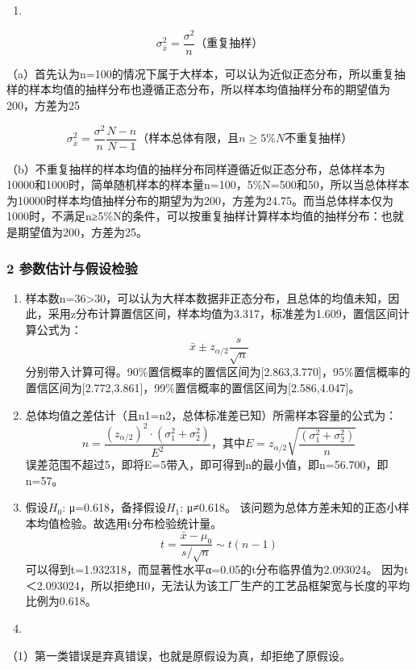 \documentclass[]{article}
\begin{document}
\begin{enumerate}
\def\labelenumi{\arabic{enumi}.}
\setcounter{enumi}{4}
\item
\end{enumerate}

\[ \sigma_{\bar x}^2=\frac{\sigma^2}{n} （重复抽样）\]

（a）首先认为n=100的情况下属于大样本，可以认为近似正态分布，所以重复抽样的样本均值的抽样分布也遵循正态分布，所以样本均值抽样分布的期望值为200，方差为25

\[ \sigma_{\bar x}^2=\frac{\sigma^2}{n}\frac{N-n}{N-1} （样本总体有限，且n\ge 5\%N不重复抽样）\]

（b）不重复抽样的样本均值的抽样分布同样遵循近似正态分布，总体样本为10000和1000时，简单随机样本的样本量n=100，5\%N=500和50，所以当总体样本为10000时样本均值抽样分布的期望为为200，方差为24.75。而当总体样本仅为1000时，不满足n≥5\%N的条件，可以按重复抽样计算样本均值的抽样分布：也就是期望值为200，方差为25。

\subsubsection{2 参数估计与假设检验}

\begin{enumerate}
\def\labelenumi{\arabic{enumi}.}
\item
  样本数n=36\textgreater{}30，可以认为大样本数据非正态分布，且总体的均值未知，因此，采用z分布计算置信区间，样本均值为3.317，标准差为1.609，置信区间计算公式为：
  \[ \bar x\pm z_{\alpha/2}\frac{s}{\sqrt{n}} \]
  分别带入计算可得。90\%置信概率的置信区间为{[}2.863,3.770{]}，95\%置信概率的置信区间为{[}2.772,3.861{]}，99\%置信概率的置信区间为{[}2.586,4.047{]}。
\item
  总体均值之差估计（且n1=n2，总体标准差已知）所需样本容量的公式为：
  \[ n=\frac{(z_{\alpha/2})^2\cdot(\sigma_1^2+\sigma_2^2)}{E^2}，其中E=z_{\alpha/2}\sqrt{\frac{(\sigma_1^2+\sigma_2^2)}{n}} \]
  误差范围不超过5，即将E=5带入，即可得到n的最小值，即n=56.700，即n=57。
\item
  假设\(H_0\): μ=0.618，备择假设\(H_1\): μ≠0.618。
  该问题为总体方差未知的正态小样本均值检验。故选用t分布检验统计量。
  \[ t=\frac{\bar x-\mu_0}{s/\sqrt{n}}\sim t(n-1)\]
  可以得到t=1.932318，而显著性水平α=0.05的t分布临界值为2.093024。
  因为t＜2.093024，所以拒绝H0，无法认为该工厂生产的工艺品框架宽与长度的平均比例为0.618。
\item
\end{enumerate}

（1）第一类错误是弃真错误，也就是原假设为真，却拒绝了原假设。
\end{document}
